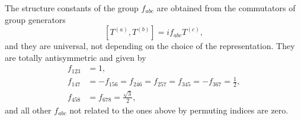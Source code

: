 The structure constants of the group $f_{abc}$ are obtained from the commutators of group generators
\begin{equation}
\left[T^{(a)},T^{(b)}\right]=if_{abc}T^{(c)},
\end{equation}
and they are universal, not depending on the choice of the representation. They are totally antisymmetric and given by
\begin{align}
f_{123}&=1,\\
f_{147}&=-f_{156}=f_{246}=f_{257}=f_{345}=-f_{367}=\frac{1}{2},\\
f_{458}&=f_{678}=\frac{\sqrt{3}}{2},
\end{align}
and all other $f_{abc}$ not related to the ones above by permuting indices are zero.


